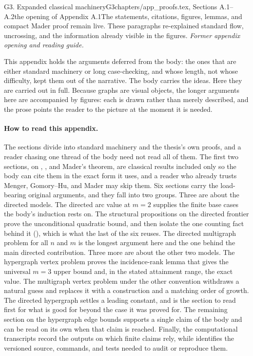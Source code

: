 \begin{offcutrewrite}{G3. Expanded classical machinery}{G3}{chapters/app\_proofs.tex, Sections A.1--A.2}{the opening of Appendix A.1}{The statements, citations, figures, lemmas, and compact Mader proof remain live. These paragraphs re-explained standard flow, uncrossing, and the information already visible in the figures.}
\noindent\emph{Former appendix opening and reading guide.}

This appendix holds the arguments deferred from the body: the ones that are either standard machinery or long case-checking, and whose length, not whose difficulty, kept them out of the narrative. The body carries the ideas. Here they are carried out in full. Because graphs are visual objects, the longer arguments here are accompanied by figures: each is drawn rather than merely described, and the prose points the reader to the picture at the moment it is needed.

\paragraph{How to read this appendix.} The sections divide into standard machinery and the thesis's own proofs, and a reader chasing one thread of the body need not read all of them. The first two sections, on , , and Mader's theorem, are classical results included only so the body can cite them in the exact form it uses, and a reader who already trusts Menger, Gomory--Hu, and Mader may skip them. Six sections carry the load-bearing original arguments, and they fall into two groups. Three are about the directed models. The directed arc value at $m = 2$ supplies the finite base cases the body's induction rests on. The structural propositions on the directed frontier prove the unconditional quadratic bound, and then isolate the one counting fact behind it (), which is what the last of the six reuses. The directed multigraph problem for all $n$ and $m$ is the longest argument here and the one behind the main directed contribution. Three more are about the other two models. The hypergraph vertex problem proves the incidence-rank lemma that gives the universal $m=3$ upper bound and, in the stated attainment range, the exact value. The multigraph vertex problem under the other convention withdraws a natural guess and replaces it with a construction and a matching order of growth. The directed hypergraph settles a leading constant, and is the section to read first for what  is good for beyond the case it was proved for. The remaining section on the hypergraph edge bounds supports a single claim of the body and can be read on its own when that claim is reached. Finally, the computational transcripts record the outputs on which finite claims rely, while  identifies the versioned source, commands, and tests needed to audit or reproduce them.


\end{offcutrewrite}
